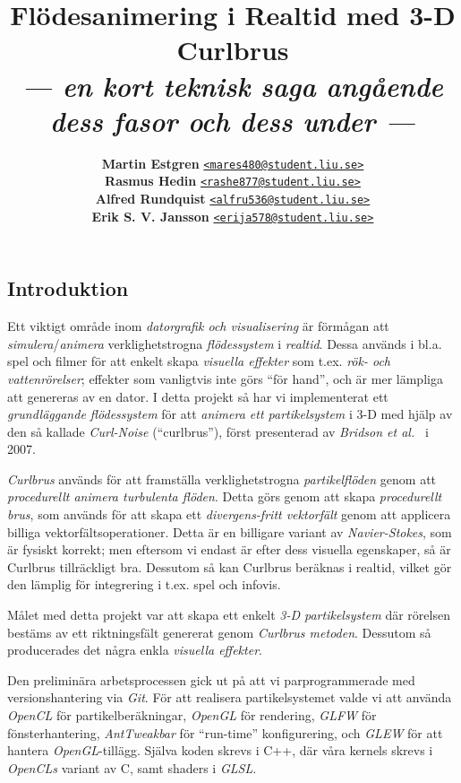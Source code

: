 \documentclass[a4paper]{article}
\date{\vspace{-0.5ex}} %
\title{\vspace{-2.2cm}\textbf{Flödesanimering i Realtid med 3-D Curlbrus}\\
       \Large{\textit{--- en kort teknisk saga angående dess fasor och dess under ---}}\vspace{-0.25cm}}
\author{{\textbf{Martin Estgren}}\;\;\;\;\;\; {\href{mailto:mares480@student.liu.se}{\texttt{<mares480@student.liu.se>}}}\\
        {\textbf{Rasmus Hedin}}\;\;\;\;\;\;\;\; {\href{mailto:rashe877@student.liu.se}{\texttt{<rashe877@student.liu.se>}}}\\
        {\textbf{Alfred Rundquist}}\;\;\; {\href{mailto:alfru536@student.liu.se}{\texttt{<alfru536@student.liu.se>}}}\\
        {\textbf{Erik S. V. Jansson}}\; {\href{mailto:erija578@student.liu.se}{\texttt{<erija578@student.liu.se>}}}}
\begin{document}
    \maketitle
\begin{multicols}{2}

    \section{Introduktion}

    Ett viktigt område inom \emph{datorgrafik och visualisering} är förmågan att \emph{simulera}/\emph{animera} verklighetstrogna \emph{flödessystem} i \emph{realtid}. Dessa används i bl.a. spel och filmer för att enkelt skapa \emph{visuella effekter} som t.ex. \emph{rök- och vattenrörelser}; effekter som vanligtvis inte görs ``för hand'', och är mer lämpliga att genereras av en dator. I detta projekt så har vi implementerat ett \emph{grundläggande flödessystem} för att \emph{animera ett partikelsystem} i 3-D med hjälp av den så kallade \emph{Curl-Noise} (``curlbrus''), först presenterad av \emph{Bridson et al.}~\cite{bridson2007curl} i 2007.

    \textit{Curlbrus} används för att framställa verklighetstrogna \emph{partikelflöden} genom att \emph{procedurellt animera turbulenta flöden}. Detta görs genom att skapa \emph{procedurellt brus}, som används för att skapa ett \emph{divergens-fritt vektorfält} genom att applicera billiga vektorfältsoperationer. Detta är en billigare variant av \emph{Navier-Stokes}, som är fysiskt korrekt; men eftersom vi endast är efter dess visuella egenskaper, så är Curlbrus tillräckligt bra. Dessutom så kan Curlbrus beräknas i realtid, vilket gör den lämplig för integrering i t.ex. spel och infovis.

    Målet med detta projekt var att skapa ett enkelt \emph{3-D partikelsystem} där rörelsen bestäms av ett riktningsfält genererat genom \emph{Curlbrus metoden}. Dessutom så producerades det några enkla \emph{visuella effekter}.

    Den preliminära arbetsprocessen gick ut på att vi parprogrammerade med versionshantering via \textit{Git}. För att realisera partikelsystemet valde vi att använda \textit{OpenCL} för partikelberäkningar, \textit{OpenGL} för rendering, \textit{GLFW} för fönsterhantering, \textit{AntTweakbar} för ``run-time'' konfigurering, och \textit{GLEW} för att hantera \textit{OpenGL}-tillägg. Själva koden skrevs i C++, där våra kernels skrevs i \textit{OpenCLs} variant av C, samt shaders i \textit{GLSL}.


\end{multicols}
\end{document}
